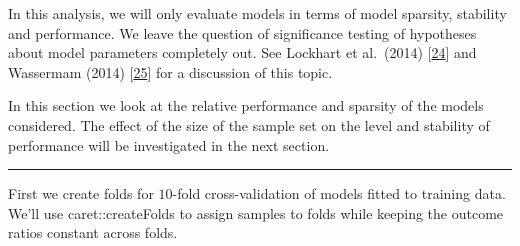 \documentclass[
]{book}
\begin{document}
In this analysis, we will only evaluate models in terms of
model sparsity, stability and performance. We leave the question
of significance testing of hypotheses about model parameters
completely out. See Lockhart et al.~(2014) {[}\protect\hyperlink{ref-Lockhart:2014aa}{24}{]}
and Wassermam (2014) {[}\protect\hyperlink{ref-Wasserman:2014aa}{25}{]} for a discussion of this topic.

In this section we look at the relative performance and sparsity of the models
considered. The effect of the size of the sample set on the level and
stability of performance will be investigated in the next section.

\begin{center}\rule{0.5\linewidth}{0.5pt}\end{center}

First we create folds for \(10\)-fold cross-validation of models fitted to
training data. We'll use caret::createFolds to assign samples
to folds while keeping the outcome ratios constant across folds.
\end{document}
